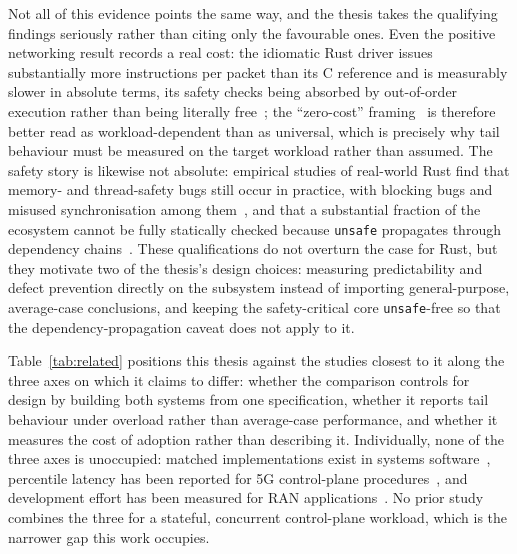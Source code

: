 \documentclass[english,twoside,openright,a4paper,censored,csm,software-track-2020]{HYthesisML}
\begin{document}
Not all of this evidence points the same way, and the thesis takes the qualifying findings
seriously rather than citing only the favourable ones. Even the positive networking result
records a real cost: the idiomatic Rust driver issues substantially more instructions per
packet than its C reference and is measurably slower in absolute terms, its safety checks
being absorbed by out-of-order execution rather than being literally
free~\cite{emmerich2019drivers}; the ``zero-cost'' framing~\cite{balasubramanian2017rust} is
therefore better read as workload-dependent than as universal, which is precisely why tail
behaviour must be measured on the target workload rather than assumed. The safety story is
likewise not absolute: empirical studies of real-world Rust find that memory- and
thread-safety bugs still occur in practice, with blocking bugs and misused synchronisation
among them~\cite{qin2020rust,qin2024safety}, and that a substantial fraction of the ecosystem
cannot be fully statically checked because \texttt{unsafe} propagates through dependency
chains~\cite{evans2020rust}. These qualifications do not overturn the case for Rust, but they
motivate two of the thesis's design choices: measuring predictability and defect prevention
directly on the subsystem instead of importing general-purpose, average-case conclusions, and
keeping the safety-critical core \texttt{unsafe}-free so that the dependency-propagation
caveat does not apply to it.

Table~\ref{tab:related} positions this thesis against the studies closest to it along the
three axes on which it claims to differ: whether the comparison controls for design by
building both systems from one specification, whether it reports tail behaviour under overload
rather than average-case performance, and whether it measures the cost of adoption rather than
describing it. Individually, none of the three axes is unoccupied: matched implementations
exist in systems software~\cite{emmerich2019drivers,li2021ipc,narayanan2020redleaf},
percentile latency has been reported for 5G control-plane
procedures~\cite{arvidsson2025async}, and development effort has been measured for RAN
applications~\cite{karlback2021ran}. No prior study combines the three for a stateful,
concurrent control-plane workload, which is the narrower gap this work occupies.
\end{document}
